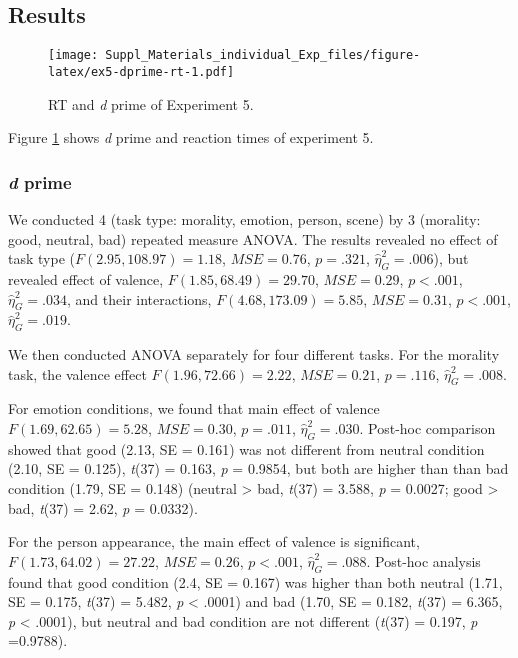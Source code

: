 \documentclass[
  english,
  man]{apa6}
\begin{document}
\hypertarget{results-8}{%
\subsection{Results}\label{results-8}}

\begin{figure}
\centering
\texttt{[image: Suppl\_Materials\_individual\_Exp\_files/figure-latex/ex5-dprime-rt-1.pdf]}
\caption{\label{fig:ex5-dprime-rt}RT and \emph{d} prime of Experiment 5.}
\end{figure}

Figure \ref{fig:ex5-dprime-rt} shows \emph{d} prime and reaction times of experiment 5.

\hypertarget{d-prime-5}{%
\subsubsection{\texorpdfstring{\emph{d} prime}{d prime}}\label{d-prime-5}}

We conducted 4 (task type: morality, emotion, person, scene) by 3 (morality: good, neutral, bad) repeated measure ANOVA. The results revealed no effect of task type (\(F(2.95, 108.97) = 1.18\), \(\mathit{MSE} = 0.76\), \(p = .321\), \(\hat{\eta}^2_G = .006\)), but revealed effect of valence, \(F(1.85, 68.49) = 29.70\), \(\mathit{MSE} = 0.29\), \(p < .001\), \(\hat{\eta}^2_G = .034\), and their interactions, \(F(4.68, 173.09) = 5.85\), \(\mathit{MSE} = 0.31\), \(p < .001\), \(\hat{\eta}^2_G = .019\).

We then conducted ANOVA separately for four different tasks. For the morality task, the valence effect \(F(1.96, 72.66) = 2.22\), \(\mathit{MSE} = 0.21\), \(p = .116\), \(\hat{\eta}^2_G = .008\).

For emotion conditions, we found that main effect of valence \(F(1.69, 62.65) = 5.28\), \(\mathit{MSE} = 0.30\), \(p = .011\), \(\hat{\eta}^2_G = .030\). Post-hoc comparison showed that good (2.13, SE = 0.161) was not different from neutral condition (2.10, SE = 0.125), \emph{t}(37) = 0.163, \emph{p} = 0.9854, but both are higher than than bad condition (1.79, SE = 0.148) (neutral \textgreater{} bad, \emph{t}(37) = 3.588, \emph{p} = 0.0027; good \textgreater{} bad, \emph{t}(37) = 2.62, \emph{p} = 0.0332).

For the person appearance, the main effect of valence is significant, \(F(1.73, 64.02) = 27.22\), \(\mathit{MSE} = 0.26\), \(p < .001\), \(\hat{\eta}^2_G = .088\). Post-hoc analysis found that good condition (2.4, SE = 0.167) was higher than both neutral (1.71, SE = 0.175, \emph{t}(37) = 5.482, \emph{p} \textless{} .0001) and bad (1.70, SE = 0.182, \emph{t}(37) = 6.365, \emph{p} \textless{} .0001), but neutral and bad condition are not different (\emph{t}(37) = 0.197, \emph{p} =0.9788).
\end{document}

